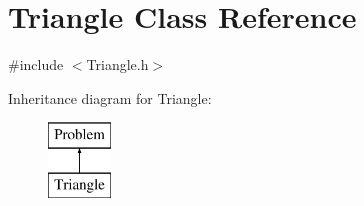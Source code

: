 \hypertarget{classTriangle}{}\section{Triangle Class Reference}
\label{classTriangle}


{\ttfamily \#include $<$Triangle.\+h$>$}

Inheritance diagram for Triangle\+:\begin{figure}[H]
\begin{center}
\leavevmode
\includegraphics[height=2.000000cm]{classTriangle}
\end{center}
\end{figure}
